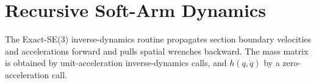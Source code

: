 \documentclass{article}
\begin{document}
\section*{Recursive Soft-Arm Dynamics}
The Exact-SE(3) inverse-dynamics routine propagates section boundary velocities and accelerations forward and pulls spatial wrenches backward. The mass matrix is obtained by unit-acceleration inverse-dynamics calls, and $h(q,\dot q)$ by a zero-acceleration call.
\end{document}
